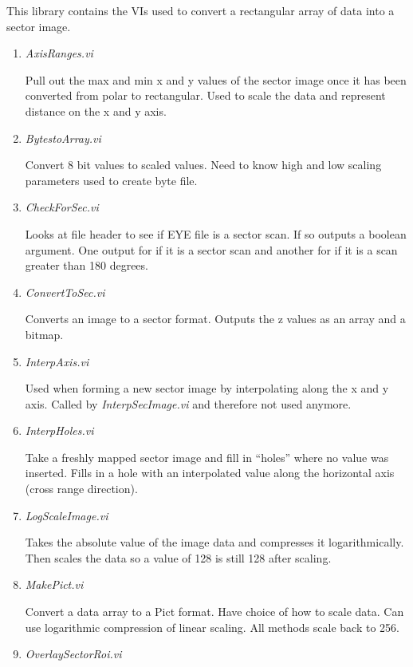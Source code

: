 \documentclass[10pt]{article}
\begin{document}
This library contains the VIs used to convert a rectangular array
of data into a sector image.

\begin{enumerate}
\item {\it AxisRanges.vi}

Pull out the max and min x and y values of the sector image once
it has been converted from polar to rectangular. Used to scale the
data and represent distance on the x and y axis.

\item {\it BytestoArray.vi}

Convert 8 bit values to scaled values. Need to know high and low
scaling parameters used to create byte file.

\item {\it CheckForSec.vi}

Looks at file header to see if EYE file is a sector scan. If so
outputs a boolean argument. One output for if it is a sector scan
and another for if it is a scan greater than 180 degrees.

\item {\it ConvertToSec.vi}

Converts an image to a sector format. Outputs the z values as an
array and a bitmap.

\item {\it InterpAxis.vi}

Used when forming a new sector image by interpolating along the x
and y axis. Called by {\it InterpSecImage.vi} and therefore not
used anymore.

\item {\it InterpHoles.vi}

Take a freshly mapped sector image and fill in ``holes'' where no
value was inserted. Fills in a hole with an interpolated value
along the horizontal axis (cross range direction).

\item {\it LogScaleImage.vi}

Takes the absolute value of the image data and compresses it
logarithmically. Then scales the data so a value of 128 is still
128 after scaling.

\item {\it MakePict.vi}

Convert a data array to a Pict format. Have choice of how to scale
data. Can use logarithmic compression of linear scaling. All
methods scale back to 256.

\item {\it OverlaySectorRoi.vi}


\end{enumerate}
\end{document}
